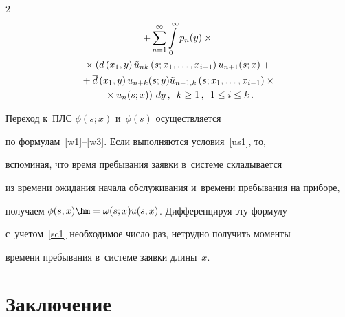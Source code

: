 \begin{multicols}{2}
\begin{multline*}
+ 


\sum\limits_{n=1}^\infty


\int\limits_0^\infty p_n(y)\times{}\\


{}\times \left(


d\left(x_1,y\right) {\tilde u}_{nk}\left(s;x_1,\dots,x_{i-1}\right)


u_{n+1}(s;x) +{}\right.


\\


{}+


\d\left(x_1,y\right) u_{n+k}(s;y) {\tilde u}_{n-1,k}\left(s;x_1,\dots,x_{i-1}\right)\times{}\\


\left.{}\times


u_{n}(s;x) %


\right)\,dy\,,  \enskip 


k \ge 1\,, \enskip 1 \le i \le k\,.


\end{multline*}





\noindent Переход к~ПЛС $\phi(s;x)$ и~$\phi(s)$ осуществляется


по формулам~\eqref{w1}--\eqref{w3}. Если выполняются условия~\eqref{us1}, то,


вспоминая, что время пребывания заявки в~системе складывается


из времени ожидания начала обслуживания и~времени пребывания на приборе,


получаем $\phi(s;x)\hm=\omega(s;x)u(s;x)$. Дифференцируя эту формулу 


с~учетом~\eqref{sc1} необходимое число раз, нетрудно получить моменты


времени пребывания  в~системе заявки  длины~$x$.








\section{Заключение}





\vspace*{-3pt}






\end{multicols}

